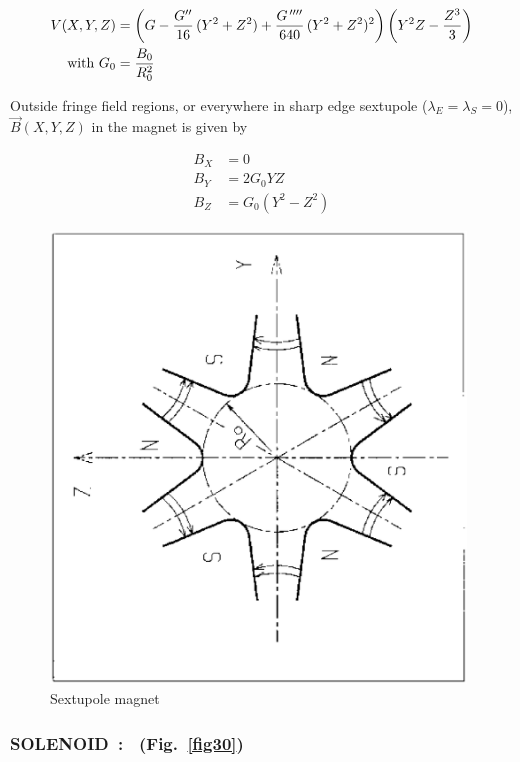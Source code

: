  \begin{align*}
 	V(X,Y,Z)    & =   \left(G- \dfrac{G^{\prime\prime} }{ 16}\, (Y^2+Z^2)+
	             \dfrac{G^{\,\prime\prime\prime\prime} }{ 640}\, (Y^2+Z^2)^2\right) 
	             \left(Y^2Z-\dfrac{Z^3 }{ 3} \right)   \\
\text{with } G_0 &   =  \dfrac{ B_0}{ R^2_0}
\end{align*}

\noindent Outside fringe field regions, or everywhere in sharp edge sextupole 
($ \lambda_E=\lambda_ S=0$),   $ \vec  B(X,Y,Z) $ in the magnet is given by 

\begin{align*}
	B_X &   =     0 \\
	B_Y &   =    2G_0YZ \\
	B_Z &   =     G_0(Y^2-Z^2)  
\end{align*}
\vfill

\begin{figure}[H]
\centerline{\includegraphics[height=12cm,angle=-90]{Fig29.ps}}
\caption{\label{fig29}Sextupole magnet}
\end{figure}
\vfill

\newpage

\subsubsection*{SOLENOID~: \SOLENOIDTitl\ (Fig.~\protect\ref{fig30}) } \label{SOLENOID}  

